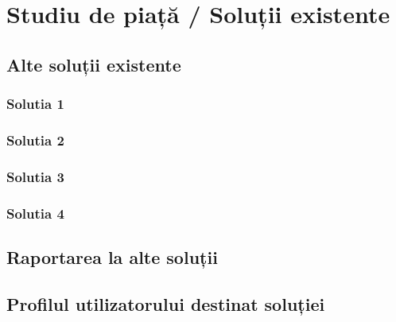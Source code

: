 \chapter{Studiu de piață / Soluții existente}
\label{chapter:studiuPiata}

\section{Alte soluții existente}
\label{sec:proj}
\subsection{Solutia 1}
\subsection{Solutia 2}
\subsection{Solutia 3}
\subsection{Solutia 4}

\section{Raportarea la alte soluții}
\label{sub-sec:proj-scope}

\section{Profilul utilizatorului destinat soluției}
\label{sub-sec:proj-user-profile}


